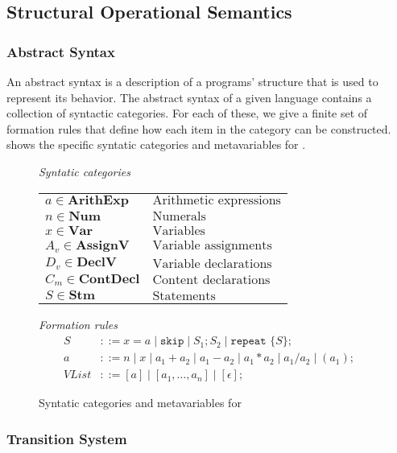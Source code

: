\subsection{Structural Operational Semantics}

\subsubsection*{Abstract Syntax}
An abstract syntax is a description of a programs' structure that is used to represent its behavior. 
The abstract syntax of a given language contains a collection of syntactic categories. 
For each of these, we give a finite set of formation rules that define how each item in the category can be constructed.
 shows the specific syntatic categories and metavariables for \dazel{}.

\begin{figure}[htbp]
	\centering
	\textit{Syntatic categories}
	\vspace{4mm}


	\begin{tabular}{l l}
		$a \in \textbf{ArithExp}$ & $\text{Arithmetic expressions}$ \\ 
		$n \in \textbf{Num}$ & $\text{Numerals}$ \\
		$x \in \textbf{Var}$ & $\text{Variables}$ \\
		$A_v \in \textbf{AssignV}$ & $\text{Variable assignments}$ \\
		$D_v \in \textbf{DeclV}$ & $\text{Variable declarations}$ \\
		$C_m \in \textbf{ContDecl}$ & $\text{Content declarations}$ \\
		$S \in \textbf{Stm}$ & $\text{Statements}$
	\end{tabular}

	\vspace{4mm}
	\textit{Formation rules}
	\begin{align*}
		S&::=x=a\mid \texttt{skip}\mid S_1;S_2\mid \texttt{repeat }\{S\}; \\
		a&::=n\mid x\mid a_1+a_2\mid a_1-a_2\mid a_1*a_2\mid a_1/a_2\mid (a_1); \\
		VList&::=[a]\mid [a_1, \ldots, a_n]\mid [\epsilon];
	\end{align*}

	\caption{Syntatic categories and metavariables for \dazel{}}
	\label{fig:SyntaticCategoriesMetavariables}
\end{figure}

\subsubsection*{Transition System}
